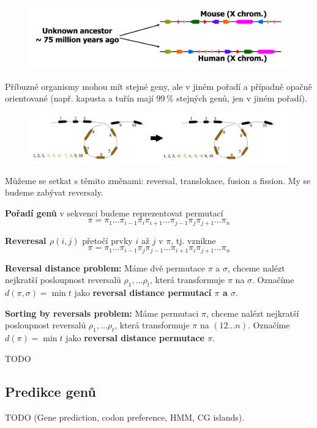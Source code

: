 \documentclass[11pt]{report} %
\numberwithin{equation}{section}
\begin{document}
\begin{figure}[H]
	\centering
	\includegraphics[scale=1]{img/genome_rearr.png}
\end{figure}

Příbuzné organismy mohou mít stejné geny, ale v jiném pořadí a případně opačně orientované (např. kapusta a tuřín mají 99\,\% stejných genů, jen v jiném pořadí). 

\begin{figure}[H]
	\centering
	\includegraphics[width=\textwidth]{img/genome_rearr2.png}
\end{figure}

Můžeme se setkat s těmito změnami: reversal, translokace, fusion a fission. My se budeme zabývat reversaly.

\textbf{Pořadí genů} v sekvenci budeme reprezentovat permutací $$\pi = \pi_1 \dots \pi_{i-1} \pi_{i} \pi_{i+1} \dots \pi_{j-1} \pi_{j} \pi_{j+1} \dots \pi_{n}$$

\textbf{Reveresal $\rho(i,j)$} přetočí prvky $i$ až $j$ v $\pi$, tj. vznikne 
$$\pi = \pi_1 \dots \pi_{i-1} \pi_{j} \pi_{j-1} \dots \pi_{i+1} \pi_{i} \pi_{j+1} \dots \pi_{n}$$

\textbf{Reversal distance problem:} Máme dvě permutace $\pi$ a $\sigma$, chceme nalézt nejkratší posloupnost reversalů $\rho_1,\dots \rho_t$, která transformuje $\pi$ na $\sigma$. Označíme $d(\pi, \sigma) = \min t$ jako \textbf{reversal distance permutací $\pi$ a $\sigma$}.

\textbf{Sorting by reversals problem:} Máme permutaci $\pi$, chceme nalézt nejkratší posloupnost reversalů $\rho_1,\dots \rho_t$, která transformuje $\pi$ na $(1 2 \dots n)$. Označíme $d(\pi) = \min t$ jako \textbf{reversal distance permutace $\pi$}.

TODO

\subsection{Predikce genů}
TODO (Gene prediction, codon preference, HMM, CG islands).
\end{document}
